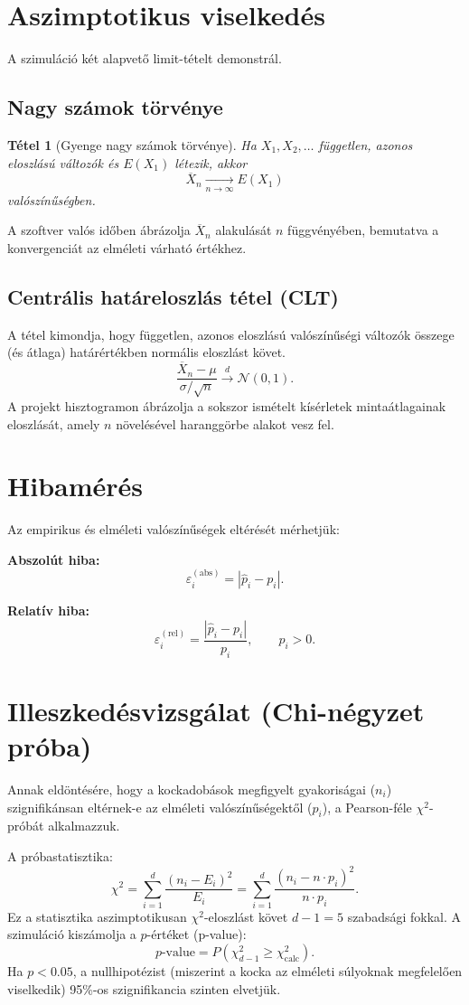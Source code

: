\documentclass[a4paper,12pt]{article}
\newtheorem{tetel}{Tétel}
\begin{document}
\section{Aszimptotikus viselkedés}

A szimuláció két alapvető limit-tételt demonstrál.

\subsection{Nagy számok törvénye}
\begin{tetel}[Gyenge nagy számok törvénye]
Ha $X_1,X_2,\dots$ független, azonos eloszlású változók és $E(X_1)$ létezik, akkor
\[
\overline X_n \xrightarrow[n\to\infty]{} E(X_1)
\]
valószínűségben.
\end{tetel}
A szoftver valós időben ábrázolja $\overline X_n$ alakulását $n$ függvényében, bemutatva a konvergenciát az elméleti várható értékhez.

\subsection{Centrális határeloszlás tétel (CLT)}
A tétel kimondja, hogy független, azonos eloszlású valószínűségi változók összege (és átlaga) határértékben normális eloszlást követ.
\[
\frac{\overline{X}_n - \mu}{\sigma / \sqrt{n}} \xrightarrow{d} \mathcal{N}(0,1).
\]
A projekt hisztogramon ábrázolja a sokszor ismételt kísérletek mintaátlagainak eloszlását, amely $n$ növelésével haranggörbe alakot vesz fel.

\section{Hibamérés}

Az empirikus és elméleti valószínűségek eltérését mérhetjük:

\textbf{Abszolút hiba:}
\[
\varepsilon_i^{(\mathrm{abs})} = |\hat p_i - p_i|.
\]

\textbf{Relatív hiba:}
\[
\varepsilon_i^{(\mathrm{rel})}
=
\frac{|\hat p_i - p_i|}{p_i},
\qquad p_i>0.
\]

\section{Illeszkedésvizsgálat (Chi-négyzet próba)}

Annak eldöntésére, hogy a kockadobások megfigyelt gyakoriságai ($n_i$) szignifikánsan eltérnek-e az elméleti valószínűségektől ($p_i$), a Pearson-féle $\chi^2$-próbát alkalmazzuk.

A próbastatisztika:
\[
\chi^2 = \sum_{i=1}^{d} \frac{(n_i - E_i)^2}{E_i} = \sum_{i=1}^{d} \frac{(n_i - n \cdot p_i)^2}{n \cdot p_i}.
\]
Ez a statisztika aszimptotikusan $\chi^2$-eloszlást követ $d-1 = 5$ szabadsági fokkal.
A szimuláció kiszámolja a $p$-értéket (p-value):
\[
p\text{-value} = P(\chi^2_{d-1} \ge \chi^2_{\text{calc}}).
\]
Ha $p < 0.05$, a nullhipotézist (miszerint a kocka az elméleti súlyoknak megfelelően viselkedik) 95\%-os szignifikancia szinten elvetjük.
\end{document}
